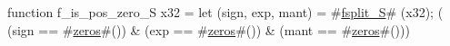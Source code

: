 function f_is_pos_zero_S   x32 = {
  let (sign, exp, mant) = #\hyperref[sailRISCVzfsplitzyS]{fsplit\_S}# (x32);
  (  (sign == #\hyperref[sailRISCVzzzeros]{zeros}#())
   & (exp  == #\hyperref[sailRISCVzzzeros]{zeros}#())
   & (mant == #\hyperref[sailRISCVzzzeros]{zeros}#()))
}
